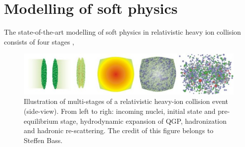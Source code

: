 \documentclass[aps,prl,twocolumn,groupedaddress]{revtex4-1}
\begin{document}
\section{Modelling of soft physics}
	The state-of-the-art modelling of soft physics in relativistic heavy ion collision consists of four stages \citep{Bass:2000ib, Shen:2014vra},
	\begin{figure}
	\begin{center}
	\includegraphics[width=\columnwidth]{pics/evo.jpg}
	\caption{Illustration of multi-stages of a relativistic heavy-ion collision event (side-view). From left to righ: incoming nuclei, initial state and pre-equilibrium stage, hydrodynamic expansion of QGP, hadronization and hadronic re-scattering. The credit of this figure belongs to Steffen Bass.}
	\label{hybrid}
	\end{center}
	\end{figure}
\end{document}
